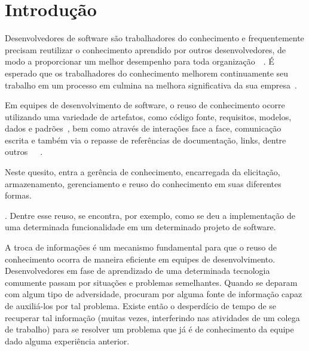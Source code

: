 \chapter{Introdução}

Desenvolvedores de software são trabalhadores do conhecimento e frequentemente precisam reutilizar o conhecimento aprendido por outros desenvolvedores, de modo a proporcionar um melhor desempenho para toda organização~\cite{Druker1993}~\cite{Wiig2003}.
É esperado que os trabalhadores do conhecimento melhorem  continuamente seu trabalho em um processo em culmina na melhora significativa da sua empresa~\cite{Kavitha2011}.


Em equipes de desenvolvimento de software, o reuso de conhecimento ocorre utilizando uma variedade de artefatos, como código fonte, requisitos, modelos, dados e padrões~\cite{Levy2009}, bem como através de interações face a face, comunicação escrita e também via o repasse de referências de documentação, links, dentre outros~\cite{Storey2014}~\cite{Olson2000}~\cite{CubraniC2004}.

Neste quesito, entra a gerência de conhecimento, encarregada da elicitação, armazenamento, gerenciamento e reuso do conhecimento em suas diferentes formas.
.
Dentre esse reuso, se encontra, por exemplo, como se deu a implementação de uma determinada funcionalidade em um determinado projeto de software.



A troca de informações é um mecanismo fundamental para que o reuso de conhecimento ocorra de maneira eficiente em equipes de desenvolvimento. Desenvolvedores em fase de aprendizado de uma determinada tecnologia comumente passam por situações e problemas semelhantes. Quando se deparam com algum tipo de adversidade, procuram por alguma fonte de informação capaz de auxiliá-los por tal problema. Existe então o desperdício de tempo de se recuperar tal informação (muitas vezes, interferindo nas atividades de um colega de trabalho) para se resolver um problema que já é de conhecimento da equipe dado alguma experiência anterior.


